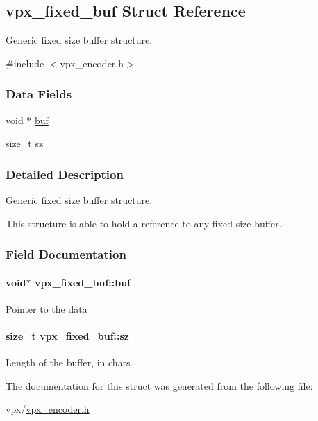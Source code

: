 \hypertarget{structvpx__fixed__buf}{
\subsection{vpx\-\_\-fixed\-\_\-buf \-Struct \-Reference}
\label{structvpx__fixed__buf}
}


\-Generic fixed size buffer structure.  




{\ttfamily \#include $<$vpx\-\_\-encoder.\-h$>$}

\subsubsection*{\-Data \-Fields}
\begin{DoxyCompactItemize}
\item 
void $\ast$ \hyperlink{structvpx__fixed__buf_ac93e43ae3fcc1023dca86d37016ae3f0}{buf}
\item 
size\-\_\-t \hyperlink{structvpx__fixed__buf_a43d7f8247ed9752f65f0a7639817ae84}{sz}
\end{DoxyCompactItemize}


\subsubsection{\-Detailed \-Description}
\-Generic fixed size buffer structure. 

\-This structure is able to hold a reference to any fixed size buffer. 

\subsubsection{\-Field \-Documentation}
\hypertarget{structvpx__fixed__buf_ac93e43ae3fcc1023dca86d37016ae3f0}{
\paragraph[{buf}]{\setlength{\rightskip}{0pt plus 5cm}void$\ast$ {\bf vpx\-\_\-fixed\-\_\-buf\-::buf}}}
\label{structvpx__fixed__buf_ac93e43ae3fcc1023dca86d37016ae3f0}
\-Pointer to the data \hypertarget{structvpx__fixed__buf_a43d7f8247ed9752f65f0a7639817ae84}{
\paragraph[{sz}]{\setlength{\rightskip}{0pt plus 5cm}size\-\_\-t {\bf vpx\-\_\-fixed\-\_\-buf\-::sz}}}
\label{structvpx__fixed__buf_a43d7f8247ed9752f65f0a7639817ae84}
\-Length of the buffer, in chars 

\-The documentation for this struct was generated from the following file\-:\begin{DoxyCompactItemize}
\item 
vpx/\hyperlink{vpx__encoder_8h}{vpx\-\_\-encoder.\-h}\end{DoxyCompactItemize}
